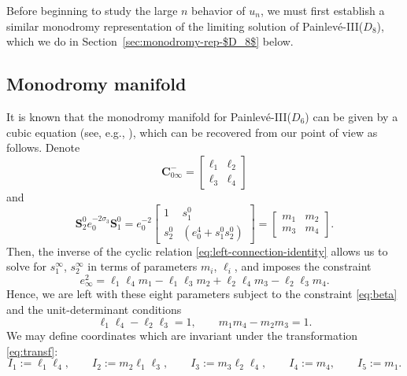 Before beginning to study the large $n$ behavior of $u_n$, we must first establish a similar monodromy representation of the limiting solution of Painlev\'e-III($D_8$), which we do in Section~\ref{sec:monodromy-rep-$D_8$} below.

\subsection{Monodromy manifold}
\label{subsec:monodromy-D6}
It is known that the monodromy manifold for Painlev\'e-III($D_6$) can be given by a cubic equation (see, e.g., \cite{PS}), which can be recovered from our point of view as follows. Denote
\begin{equation*}
 \mathbf{C}_{0\infty}^-=\begin{bmatrix}
 \ell_1&\ell_2\\\ell_3&\ell_4
 \end{bmatrix}
\end{equation*}
and
\begin{equation*}
 \mathbf{S}^0_{2}e_0^{-2\sigma_3}\mathbf{S}_{1}^0 =e_0^{-2} \begin{bmatrix}
 1& s^0_1\\ s^0_2& \left(e_0^4+s^0_1s^0_2 \right)
 \end{bmatrix}=\begin{bmatrix}
 m_1&m_2\\m_3&m_4
 \end{bmatrix}.
\end{equation*}
Then, the inverse of the cyclic relation \eqref{eq:left-connection-identity} allows us to solve for $s_1^\infty$, $s_2^\infty$ in terms of parameters $m_i$, $\ell_i$, and imposes the constraint
\begin{equation}\label{eq:beta}
 e_\infty^2=\ell_1\ell_4m_1-\ell_1\ell_3m_2+\ell_2\ell_4m_3-\ell_2\ell_3m_4.
\end{equation}
Hence, we are left with these eight parameters subject to the constraint \eqref{eq:beta} and the unit-determinant conditions
\begin{equation}\label{eq:det}
 \ell_1\ell_4-\ell_2\ell_3=1,\qquad m_1m_4-m_2m_3=1.
\end{equation}
We may define coordinates which are invariant under the transformation \eqref{eq:transf}:
\begin{equation*}
 I_1:= \ell_1\ell_4,\qquad I_2 := m_2\ell_1\ell_3,\qquad I_3 :=m_3\ell_2\ell_4,\qquad I_4:= m_4, \qquad I_5:= m_1.
 \end{equation*}
